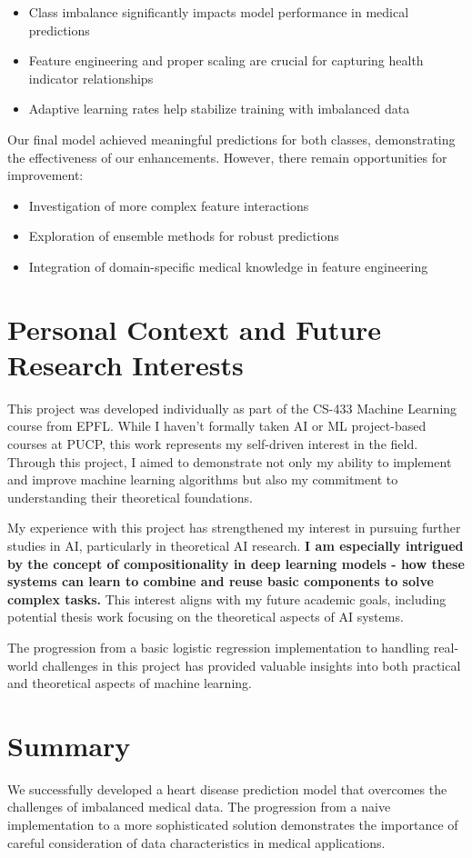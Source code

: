 \documentclass[10pt,conference,compsocconf]{IEEEtran}
\begin{document}
\begin{itemize}
    \item Class imbalance significantly impacts model performance in medical predictions
    \item Feature engineering and proper scaling are crucial for capturing health indicator
    relationships
    \item Adaptive learning rates help stabilize training with imbalanced data
\end{itemize}

Our final model achieved meaningful predictions for both classes, demonstrating the
effectiveness of our enhancements. However, there remain opportunities for improvement:

\begin{itemize}
    \item Investigation of more complex feature interactions
    \item Exploration of ensemble methods for robust predictions
    \item Integration of domain-specific medical knowledge in feature engineering
\end{itemize}

\section{Personal Context and Future Research Interests}

This project was developed individually as part of the CS-433 Machine Learning course from EPFL.
While I haven't formally taken AI or ML project-based courses at PUCP,
this work represents my self-driven interest in the field. Through this project,
I aimed to demonstrate not only my ability to implement and improve machine learning
algorithms but also my commitment to understanding their theoretical foundations.

My experience with this project has strengthened my interest in pursuing further studies in AI,
particularly in theoretical AI research. \textbf{I am especially intrigued by the concept of
compositionality in deep learning models - how these systems can learn to combine and reuse
basic components to solve complex tasks.} This interest aligns with my future academic goals,
including potential thesis work focusing on the theoretical aspects of AI systems.

The progression from a basic logistic regression implementation to handling real-world
challenges in this project has provided valuable insights into both practical
and theoretical aspects of machine learning.

\section{Summary}

We successfully developed a heart disease prediction model that overcomes the challenges of
imbalanced medical data. The progression from a naive implementation to a more sophisticated
solution demonstrates the importance of careful consideration of data characteristics in
medical applications.
\end{document}

